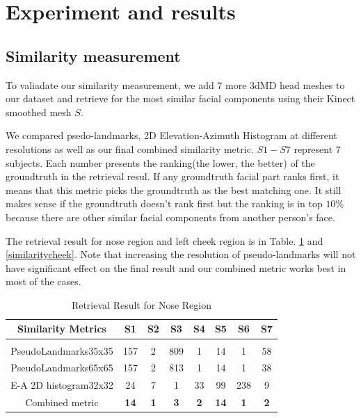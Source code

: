 \documentclass[annual]{acmsiggraph}
\begin{document}
\section{Experiment and results}
\subsection{Similarity measurement}
To valiadate our similarity measurement, we add 7 more 3dMD head meshes to our dataset and retrieve for the most similar facial components using their Kinect smoothed mesh $S$. 

We compared psedo-landmarks, 2D Elevation-Azimuth Histogram at different resolutions as well as our final combined similarity metric. $S1-S7$ represent 7 subjects. Each number presents the ranking(the lower, the better) of the groundtruth in the retrieval resul. If any groundtruth facial part ranks first, it means that this metric picks the groundtruth as the best matching one. It still makes sense if the groundtruth doesn't rank first but the ranking is in top $10\%$ because there are other similar facial components from another person's face.

The retrieval result for nose region and left cheek region is in Table. \ref{similaritynose} and \ref{similaritycheek}. Note that increasing the resolution of  pseudo-landmarks will not have significant effect on the final result and our combined metric works best in most of the cases.
\begin{table}[!hbp]
\caption{Retrieval Result for Nose Region}
\label{similaritynose}
\begin{center}
\begin{tabular}{cccccccc}
\multicolumn{1}{c}{\bf{Similarity Metrics}} &\multicolumn{1}{c}{S1}  &\multicolumn{1}{c}{S2} &\multicolumn{1}{c}{S3} &\multicolumn{1}{c}{S4}  &\multicolumn{1}{c}{S5} &\multicolumn{1}{c}{S6}   
&\multicolumn{1}{c}{S7} 
\\ \hline \\
PseudoLandmarks35x35 &157 &2 &809 &1 &14 &1 &58\\
PseudoLandmarks65x65 &157 &2 &813 &1 &14 &1 &38\\
E-A 2D histogram32x32    &24  &7 &1 &33 &99 &238 &9\\
Combined metric &\bf{14}  &\bf{1} &\bf{3} &\bf{2} &\bf{14} &\bf{1} &\bf{2}\\
\end{tabular}
\end{center}
\end{table}
\end{document}
